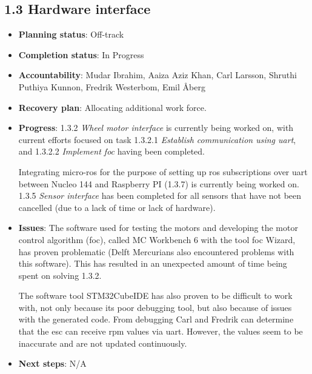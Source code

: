 \subsection*{1.3 Hardware interface}
\begin{itemize}
    \item \textbf{Planning status}: Off-track
    \item \textbf{Completion status}: In Progress 
    \item \textbf{Accountability}: Mudar Ibrahim, Aaiza Aziz Khan, Carl Larsson, Shruthi Puthiya Kunnon, Fredrik Westerbom, Emil Åberg
    \item \textbf{Recovery plan}: Allocating additional work force. 
    \item \textbf{Progress}: 1.3.2 \textit{Wheel motor interface} is currently being worked on, with current efforts focused on task 1.3.2.1 \textit{Establish communication using \acs{uart}}, and 1.3.2.2 \textit{Implement \acs{foc}} having been completed. 
    
    Integrating \ac{micro-ros} for the purpose of setting up \ac{ros} subscriptions over \ac{uart} between Nucleo 144 and Raspberry PI (1.3.7) is currently being worked on. 1.3.5 \textit{Sensor interface} has been completed for all sensors that have not been cancelled (due to a lack of time or lack of hardware).
    \item \textbf{Issues}: The software used for testing the motors and developing the motor control algorithm (\ac{foc}), called MC Workbench 6 with the tool \acs{foc} Wizard, has proven problematic (Delft Mercurians also encountered problems with this software). This has resulted in an unexpected amount of time being spent on solving 1.3.2.
    
    The software tool STM32CubeIDE has also proven to be difficult to work with, not only because its poor debugging tool, but also because of issues with the generated code. From debugging Carl and Fredrik can determine that the \ac{esc} can receive \ac{rpm} values via \ac{uart}. However, the values seem to be inaccurate and are not updated continuously.
    \item \textbf{Next steps}: N/A
\end{itemize}


